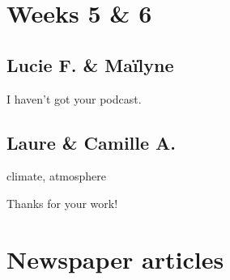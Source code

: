 \documentclass[12pt,oneside]{report}
\begin{document}
\begin{spacing}{1.2}
\section{Weeks 5 \& 6}

\subsection*{Lucie F. \& Maïlyne}

\color{blue}
I haven't got your podcast.
\color{black}

\subsection*{Laure \& Camille A.}

climate, atmosphere

\color{blue}
Thanks for your work!
\color{black}




\section{Newspaper articles}




\end{spacing}
\end{document}
